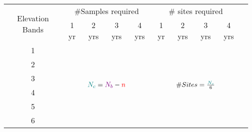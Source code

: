\begin{table}\scriptsize
\centering
\begin{tabular}{ccccc|ccccc}
\toprule
 \multirow{2}{1cm}{Elevation Bands}  &     \multicolumn{4}{c|}{ \#Samples required} & \multicolumn{4}{c}{\# sites required} \\ \cline{2-9}\noalign{\smallskip}
\multicolumn{1}{c}{}& 1 yr  & 2 yrs   & 3 yrs    & 4 yrs                   & 1 yr   & 2 yrs  & 3 yrs  & 4 yrs\\ \midrule
						
1  &\multicolumn{4}{c|}{\multirow{6}{*}{\large$\textcolor{teal}{N_c}={\textcolor{violet}{N_b} - \textcolor{red}{n}}$}}& \multicolumn{4}{c}{\multirow{6}{*}{\large$\#Sites = {\textcolor{teal}{N_c} \over 6}$}}                                                               \\ 
2    &\multicolumn{4}{c|}{}&\multicolumn{4}{c}{}                                                              \\ 
3   &\multicolumn{4}{c|}{}   &\multicolumn{4}{c}{}                                                                 \\
4    &\multicolumn{4}{c|}{}   &\multicolumn{4}{c}{}                                                             \\ 
5    &\multicolumn{4}{c|}{}    &\multicolumn{4}{c}{}                                                                \\ 
6    &\multicolumn{4}{c|}{}   &\multicolumn{4}{c}{}                                                       \\ \bottomrule
\end{tabular}
\end{table}

 

